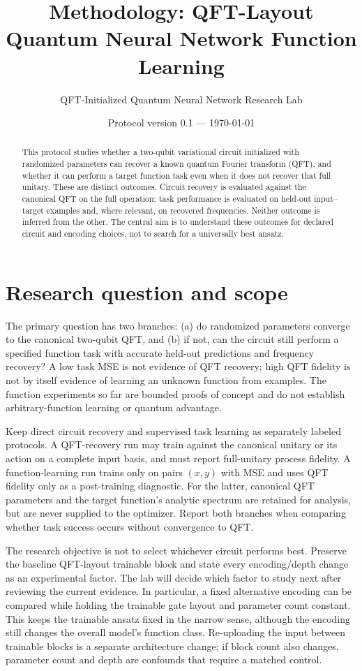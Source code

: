 \documentclass[11pt]{article}
\title{Methodology: QFT-Layout Quantum Neural Network Function Learning}
\author{QFT-Initialized Quantum Neural Network Research Lab}
\date{Protocol version 0.1 --- \today}
\begin{document}
\maketitle

\begin{abstract}
This protocol studies whether a two-qubit variational circuit initialized with randomized parameters can recover a known quantum Fourier transform (QFT), and whether it can perform a target function task even when it does not recover that full unitary. These are distinct outcomes. Circuit recovery is evaluated against the canonical QFT on the full operation; task performance is evaluated on held-out input--target examples and, where relevant, on recovered frequencies. Neither outcome is inferred from the other. The central aim is to understand these outcomes for declared circuit and encoding choices, not to search for a universally best ansatz.
\end{abstract}

\section{Research question and scope}

The primary question has two branches: (a) do randomized parameters converge to the canonical two-qubit QFT, and (b) if not, can the circuit still perform a specified function task with accurate held-out predictions and frequency recovery? A low task MSE is not evidence of QFT recovery; high QFT fidelity is not by itself evidence of learning an unknown function from examples. The function experiments so far are bounded proofs of concept and do not establish arbitrary-function learning or quantum advantage.

Keep direct circuit recovery and supervised task learning as separately labeled protocols. A QFT-recovery run may train against the canonical unitary or its action on a complete input basis, and must report full-unitary process fidelity. A function-learning run trains only on pairs $(x,y)$ with MSE and uses QFT fidelity only as a post-training diagnostic. For the latter, canonical QFT parameters and the target function's analytic spectrum are retained for analysis, but are never supplied to the optimizer. Report both branches when comparing whether task success occurs without convergence to QFT.

The research objective is not to select whichever circuit performs best. Preserve the baseline QFT-layout trainable block and state every encoding/depth change as an experimental factor. The lab will decide which factor to study next after reviewing the current evidence. In particular, a fixed alternative encoding can be compared while holding the trainable gate layout and parameter count constant. This keeps the trainable ansatz fixed in the narrow sense, although the encoding still changes the overall model's function class. Re-uploading the input between trainable blocks is a separate architecture change; if block count also changes, parameter count and depth are confounds that require a matched control.
\end{document}
